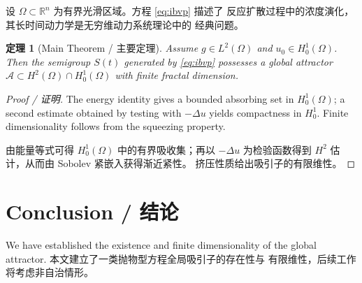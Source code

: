 \documentclass[11pt,a4paper,UTF8,fontset=fandol]{ctexart}
\newtheorem{theorem}{定理}[section]
\newcommand{\R}{\mathbb{R}}
\newcommand{\Om}{\Omega}
\begin{document}
设 $\Om\subset\R^n$ 为有界光滑区域。方程 \eqref{eq:ibvp} 描述了
反应扩散过程中的浓度演化，其长时间动力学是无穷维动力系统理论中的
经典问题。

\begin{theorem}[Main Theorem / 主要定理]
Assume $g\in L^2(\Om)$ and $u_0\in H^1_0(\Om)$. Then the semigroup
$S(t)$ generated by \eqref{eq:ibvp} possesses a global attractor
$\mathcal{A}\subset H^2(\Om)\cap H^1_0(\Om)$ with finite fractal
dimension.
\end{theorem}

\begin{proof}[Proof / 证明]
The energy identity gives a bounded absorbing set in $H^1_0(\Om)$;
a second estimate obtained by testing with $-\Delta u$ yields
compactness in $H^1_0$. Finite dimensionality follows from the
squeezing property. \par
由能量等式可得 $H^1_0(\Om)$ 中的有界吸收集；再以 $-\Delta u$
为检验函数得到 $H^2$ 估计，从而由 Sobolev 紧嵌入获得渐近紧性。
挤压性质给出吸引子的有限维性。
\end{proof}

\section{Conclusion / 结论}
We have established the existence and finite dimensionality of the
global attractor. 本文建立了一类抛物型方程全局吸引子的存在性与
有限维性，后续工作将考虑非自治情形。
\end{document}
